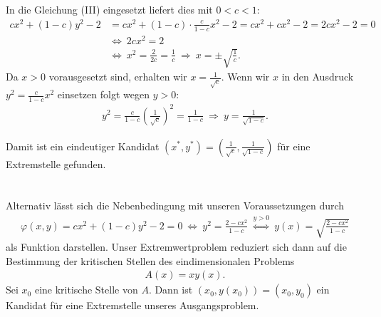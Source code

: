 In die Gleichung (III) eingesetzt liefert dies mit $ 0 < c < 1 $:
\begin{align*}
 c x^2 +(1-c) y^2 -2 &= 
 c x^2 +(1-c) \cdot \frac{c}{1-c} x^2 -2
 =
 c x^2 + c x^2 - 2 = 2 c x^2 - 2 = 0\\
 \ &\Leftrightarrow \
 2c x^2= 2 \\
 \ &\Leftrightarrow \
 x^2 = \frac{2}{2c}= \frac{1}{c}
\ \Rightarrow \
 x = \pm \sqrt{\frac{1}{c}} 
.
\end{align*}
Da $ x > 0  $ vorausgesetzt sind, erhalten wir $ x = \frac{1}{\sqrt{c} } $.
Wenn wir $ x $ in den Ausdruck $ y^2 = \frac{c}{1-c} x^2 $ einsetzen folgt wegen $ y >0 $:
\begin{align*}
y^2 = \frac{c}{1-c} \left( \frac{1}{\sqrt{c}}\right)^2 = \frac{1}{1-c} 
\ \Rightarrow \
y = \frac{1}{\sqrt{1-c}}. 
\end{align*}

Damit ist ein eindeutiger Kandidat $ (x^\ast,y^\ast) = \left(\frac{1}{\sqrt{c}  },  \frac{1}{\sqrt{1-c}}\right) $ für eine Extremstelle gefunden.\\
\\
\ \\ 
Alternativ lässt sich die Nebenbedingung mit unseren Voraussetzungen durch
\begin{align*}
\varphi(x,y) = cx^2 +(1-c) y^2 -2 = 0 
\ \Leftrightarrow \
y^2 = \frac{2 - cx^2}{1-c}
\ \overset{y > 0}{\Leftrightarrow} \
y(x) =  \sqrt{\frac{2 - cx^2}{1-c}}
\end{align*}
als Funktion darstellen. 
Unser Extremwertproblem reduziert sich dann auf die Bestimmung der kritischen Stellen des eindimensionalen Problems
\begin{align*}
A(x) = x y(x).
\end{align*}
Sei $ x_0 $ eine kritische Stelle von $ A $. Dann ist $ (x_0,y(x_0)) = (x_0,y_0) $ ein Kandidat für eine Extremstelle unseres Ausgangsproblem.  
\newpage
